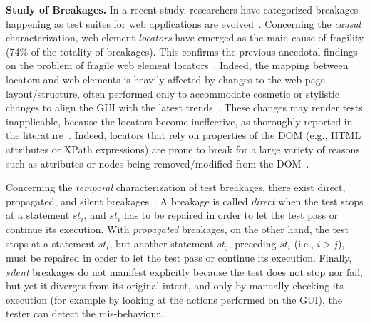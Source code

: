 \noindent
\textbf{Study of Breakages.}
In a recent study, researchers have categorized breakages happening as test suites for web applications are evolved~\cite{Hammoudi-2016-ICST}. 
%
Concerning the \textit{causal} characterization, web element \textit{locators} have emerged as the main cause of fragility (74\% of the totality of breakages). %
%
This confirms the previous anecdotal findings on the problem of fragile web element locators~\cite{2016-Leotta-JSEP,2014-leotta-WoSAR,Daniel:2011:AGR:2002931.2002937,2013-Ricca-wse}.
%
Indeed, the mapping between locators and web elements is heavily affected by changes to the web page layout/structure, often performed only to accommodate cosmetic or stylistic changes to align the GUI with the latest trends~\cite{2016-leotta-Advances,2016-Leotta-JSEP}. These changes may render tests inapplicable, because the locators become ineffective, as thoroughly reported in the literature~\cite{2016-leotta-Advances,2016-Leotta-JSEP,Choudhary:2011:WWA:2002931.2002935,Hammoudi-2016-ICST,2013-Ricca-wse}. 
Indeed, locators that rely on properties of the DOM (e.g., HTML attributes or XPath expressions) are prone to break for a large variety of reasons such as attributes or nodes being removed/modified from the DOM~\cite{Choudhary:2011:WWA:2002931.2002935}.

Concerning the \textit{temporal} characterization of test breakages, there exist direct, propagated, and silent breakages~\cite{Hammoudi-2016-ICST}. A breakage is called \textit{direct} when the test stops at a statement $st_i$, and $st_i$ has to be repaired in order to let the test pass or continue its execution. With \textit{propagated} breakages, on the other hand, the test stops at a statement $st_i$, but another statement $st_j$, preceding $st_i$ (i.e., $i > j$), must be repaired in order to let the test pass or continue its execution. Finally, \textit{silent} breakages do not manifest explicitly because the test does not stop nor fail, but yet it diverges from its original intent, and only by manually checking its execution (for example by looking at the actions performed on the GUI), the tester can detect the mis-behaviour.

